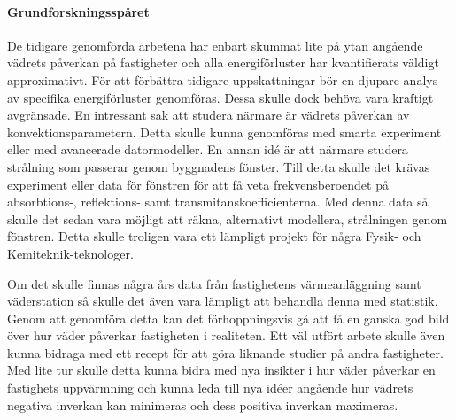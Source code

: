 \paragraph{Grundforskningsspåret}

De tidigare genomförda arbetena har enbart skummat lite på ytan angående vädrets påverkan på fastigheter och alla energiförluster
har kvantifierats väldigt approximativt. För att förbättra tidigare uppskattningar bör en djupare analys
av specifika energiförluster genomföras. Dessa skulle dock behöva vara kraftigt avgränsade. En intressant sak att studera
närmare är vädrets påverkan av konvektionsparametern. Detta skulle kunna genomföras med smarta experiment eller
med avancerade datormodeller. En annan idé är att närmare studera strålning som passerar genom byggnadens fönster. Till detta
skulle det krävas experiment eller data för fönstren för att få veta frekvensberoendet på absorbtions-, reflektions- samt
transmitanskoefficienterna. Med
denna data så skulle det sedan vara möjligt att räkna, alternativt modellera, strålningen genom fönstren. Detta skulle troligen
vara ett lämpligt projekt för några Fysik- och Kemiteknik-teknologer.

Om det skulle finnas några års data från fastighetens värmeanläggning samt väderstation så skulle det
även vara lämpligt att behandla denna med statistik. Genom att genomföra detta kan det förhoppningsvis
gå att få en ganska god bild över hur väder påverkar fastigheten i realiteten. Ett väl utfört arbete skulle
även kunna bidraga med ett recept för att göra liknande studier på andra fastigheter. Med lite tur skulle detta
kunna bidra med nya insikter i hur väder påverkar en fastighets uppvärmning och kunna leda till nya idéer angående
hur vädrets negativa inverkan kan minimeras och dess positiva inverkan maximeras.
